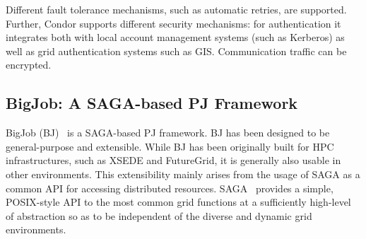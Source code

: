 \documentclass[conference]{IEEEtran}
\begin{document}
Different fault tolerance mechanisms, such as automatic retries, are
supported.  Further, Condor supports different security mechanisms:
for authentication it integrates both with local account management
systems (such as Kerberos) as well as grid authentication systems such
as GIS. Communication traffic can be encrypted.


\subsection{BigJob: A SAGA-based PJ Framework}
\label{sec:bigjob_description}












BigJob (BJ)~\cite{bigjob_web,saga_bigjob_condor_cloud} is a SAGA-based PJ
framework. BJ has been designed to be general-purpose and extensible. While BJ
has been originally built for HPC infrastructures, such as XSEDE and FutureGrid,
it is generally also usable in other environments. This extensibility mainly
arises from the usage of SAGA as a common API for accessing distributed
resources. SAGA~\cite{saga_url,ogf-gfd-90} provides a simple, POSIX-style API to
the most common grid functions at a sufficiently high-level of abstraction so as
to be independent of the diverse and dynamic grid environments.
\end{document}
